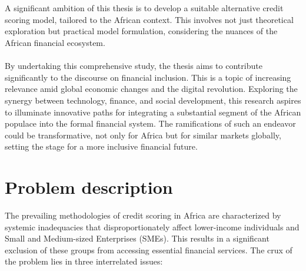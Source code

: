 \documentclass[a4paper,11pt,fleqn]{report}
\begin{document}
\\\\
A significant ambition of this thesis is to develop a suitable alternative credit scoring model, tailored to the African context. This involves not just theoretical exploration but practical model formulation, considering the nuances of the African financial ecosystem.
\\\\
By undertaking this comprehensive study, the thesis aims to contribute significantly to the discourse on financial inclusion. This is a topic of increasing relevance amid global economic changes and the digital revolution. Exploring the synergy between technology, finance, and social development, this research aspires to illuminate innovative paths for integrating a substantial segment of the African populace into the formal financial system. The ramifications of such an endeavor could be transformative, not only for Africa but for similar markets globally, setting the stage for a more inclusive financial future.

\section{Problem description}

The prevailing methodologies of credit scoring in Africa are characterized by systemic inadequacies that disproportionately affect lower-income individuals and Small and Medium-sized Enterprises (SMEs). This results in a significant exclusion of these groups from accessing essential financial services. The crux of the problem lies in three interrelated issues:
\end{document}
